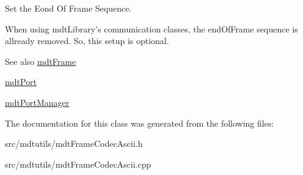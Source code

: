 Set the Eond Of Frame Sequence. 

When using mdtLibrary's communication classes, the endOfFrame sequence is allready removed. So, this setup is optional. \begin{DoxySeeAlso}{See also}
\hyperlink{classmdt_frame}{mdtFrame} 

\hyperlink{classmdt_port}{mdtPort} 

\hyperlink{classmdt_port_manager}{mdtPortManager} 
\end{DoxySeeAlso}


The documentation for this class was generated from the following files:\begin{DoxyCompactItemize}
\item 
src/mdtutils/mdtFrameCodecAscii.h\item 
src/mdtutils/mdtFrameCodecAscii.cpp\end{DoxyCompactItemize}

